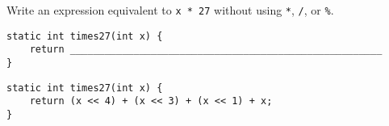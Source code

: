 \question Write an expression equivalent to \texttt{x * 27} without using \texttt{*}, \texttt{/}, or \texttt{\%}.

\ifprintanswers\else
\begin{lstlisting}
static int times27(int x) {
    return ______________________________________________________
}
\end{lstlisting}
\fi

\begin{solution}
\begin{lstlisting}
static int times27(int x) {
    return (x << 4) + (x << 3) + (x << 1) + x;
}
\end{lstlisting}
\end{solution}